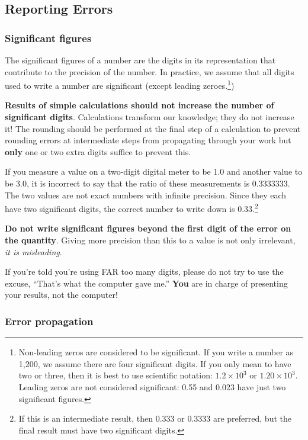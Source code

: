 \subsection{Reporting Errors}
\subsubsection{Significant figures}

The significant figures of a number are the digits in its representation that contribute to the precision of the number. In practice, we assume that all digits used to write a number are significant (except leading zeroes.\footnote{Non-leading zeros are considered to be significant. If you write a number as 1,200, we assume there are four significant digits. If you only mean to have two or three, then it is best to use scientific notation: $1.2 \times 10^3$ or $1.20 \times 10^3$. Leading zeros are not considered significant: 0.55 and 0.023 have just two significant figures.})

\textbf{Results of simple calculations should not increase the number of significant digits}. Calculations transform our knowledge; they do not increase it! The rounding should be performed at the final step of a calculation to prevent rounding errors at intermediate steps from propagating through your work but \textbf{only} one or two
extra digits suffice to prevent this.

If you measure a value on a two-digit digital meter to be 1.0 and another value to be 3.0, it is incorrect to say that the ratio of these measurements is 0.3333333. The two values are not exact numbers with infinite precision. Since they each have two significant digits, the correct number to write down is 0.33.\footnote{If this is an intermediate result, then 0.333 or 0.3333 are preferred, but the final result must have two significant digits.}

\begin{imp}
\textbf{Do not write significant figures beyond the first digit of the error on the quantity}. Giving more precision than this to a value is not only irrelevant, \textit{it is misleading}.

If you're told you're using FAR too many digits, please do not try to use the excuse, ``That's what the computer gave me.'' \textbf{You} are in charge of presenting your results, not the computer!
\end{imp}


\subsubsection{Error propagation}

